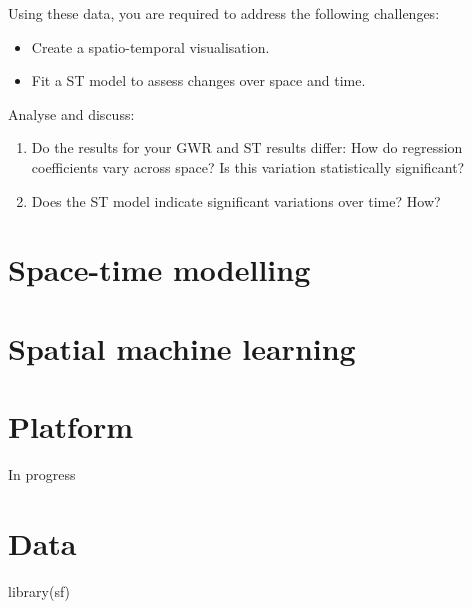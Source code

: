 \documentclass[
  letterpaper,
  krantz2]{style/krantz}
\newenvironment{Shaded}{\begin{snugshade}}{\end{snugshade}}
\newcommand{\FunctionTok}[1]{\textcolor[rgb]{0.28,0.35,0.67}{#1}}
\newcommand{\NormalTok}[1]{\textcolor[rgb]{0.00,0.23,0.31}{#1}}
\providecommand{\tightlist}{%
  \setlength{\itemsep}{0pt}\setlength{\parskip}{0pt}}\usepackage{longtable,booktabs,array}
\begin{document}
Using these data, you are required to address the following challenges:

\begin{itemize}
\item
  Create a spatio-temporal visualisation.
\item
  Fit a ST model to assess changes over space and time.
\end{itemize}

Analyse and discuss:

\begin{enumerate}
\def\labelenumi{\arabic{enumi}.}
\tightlist
\item
  Do the results for your GWR and ST results differ: How do regression
  coefficients vary across space? Is this variation statistically
  significant?
\item
  Does the ST model indicate significant variations over time? How?
\end{enumerate}

\hypertarget{space-time-modelling}{%
\chapter{Space-time modelling}\label{space-time-modelling}}

\hypertarget{spatial-machine-learning}{%
\chapter{Spatial machine learning}\label{spatial-machine-learning}}


\hypertarget{platform}{%
\chapter{Platform}\label{platform}}

In progress


\hypertarget{data-8}{%
\chapter{Data}\label{data-8}}

\begin{Shaded}
\begin{Highlighting}[]
\FunctionTok{library}\NormalTok{(sf)}
\end{Highlighting}
\end{Shaded}
\end{document}
